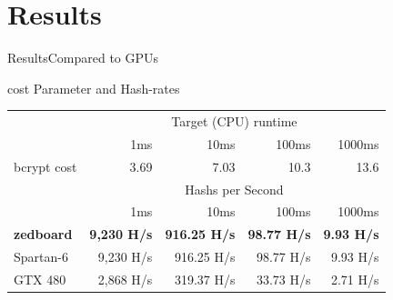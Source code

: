 \section{Results}
\begin{frame}{Results}{Compared to GPUs}
\begin{block}{cost Parameter and Hash-rates}
\begin{table}[tp]
  \centering
  \begin{tabular}{l r r r r}
    \toprule
              & \multicolumn{4}{c}{Target (CPU) runtime}\\
              &\quad 1ms \quad   &\quad 10ms \quad   &\quad  100ms \quad   &\quad  1000ms \quad   \\
    \midrule
    bcrypt cost    & 3.69   & 7.03    & 10.3      & 13.6   \\
    \midrule
                   & \multicolumn{4}{c}{Hashs per Second}\\
                   & \quad 1ms \quad & \quad 10ms \quad & \quad 100ms \quad & \quad 1000ms \quad\\
    \midrule
    {\bf zedboard} &{\bf 9,230 H/s}  &{\bf 916.25 H/s}  &{\bf 98.77 H/s}    &{\bf 9.93 H/s}     \\
    Spartan-6      &{9,230 H/s}      &{916.25 H/s}      &{98.77 H/s}        &{9.93 H/s}         \\
    GTX 480        & 2,868 H/s       & 319.37 H/s       & 33.73 H/s         & 2.71 H/s          \\
    \bottomrule
  \end{tabular}
\end{table}
\end{block}
\end{frame}

